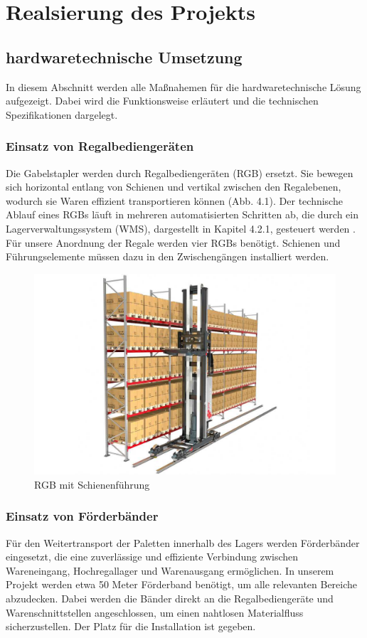 \chapter{Realsierung des Projekts}

\section{hardwaretechnische Umsetzung}
In diesem Abschnitt werden alle Maßnahemen für die hardwaretechnische Lösung aufgezeigt. Dabei wird die Funktionsweise erläutert und die technischen Spezifikationen dargelegt.
\subsection{Einsatz von Regalbediengeräten}
Die Gabelstapler werden durch Regalbediengeräten (RGB) ersetzt. Sie bewegen sich horizontal entlang von Schienen und vertikal zwischen den Regalebenen, wodurch sie Waren effizient transportieren können (Abb. 4.1).
Der technische Ablauf eines RGBs läuft in mehreren automatisierten Schritten ab, die durch ein Lagerverwaltungssystem (WMS), dargestellt in Kapitel 4.2.1, gesteuert werden \autocites{martin_technische_2021}. Für unsere Anordnung der Regale werden vier RGBs benötigt. Schienen und Führungselemente müssen dazu in den Zwischengängen installiert werden\autocite{Logistik_2024}.

\begin{figure}
	\centering
	\includegraphics[width=0.5\linewidth]{images/RGB}
	\caption[RGB mit Schienenführung \autocite{Logistik_2024}]{RGB mit Schienenführung}
	\label{fig:rgb}
\end{figure}



\subsection{Einsatz von Förderbänder}
Für den Weitertransport der Paletten innerhalb des Lagers werden Förderbänder eingesetzt, die eine zuverlässige und effiziente Verbindung zwischen Wareneingang, Hochregallager und Warenausgang ermöglichen. In unserem Projekt werden etwa 50 Meter Förderband benötigt, um alle relevanten Bereiche abzudecken. Dabei werden die Bänder direkt an die Regalbediengeräte und Warenschnittstellen angeschlossen, um einen nahtlosen Materialfluss sicherzustellen. Der Platz für die Installation ist gegeben.


